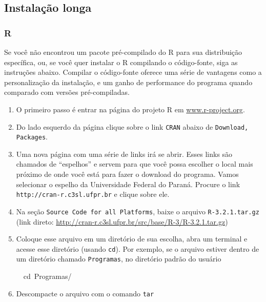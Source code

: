 \documentclass[a4paper,12pt]{article}\usepackage[]{graphicx}\usepackage[]{color}
\makeatletter
\newcommand{\hlopt}[1]{\textcolor[rgb]{0,0,0}{#1}}%
\newcommand{\hlstd}[1]{\textcolor[rgb]{0.345,0.345,0.345}{#1}}%
\newcommand{\hlkwb}[1]{\textcolor[rgb]{0.69,0.353,0.396}{#1}}%
\newenvironment{kframe}{%
 \def\at@end@of@kframe{}%
 \ifinner\ifhmode%
  \def\at@end@of@kframe{\end{minipage}}%
  \begin{minipage}{\columnwidth}%
 \fi\fi%
 \def\FrameCommand##1{\hskip\@totalleftmargin \hskip-\fboxsep
 \colorbox{shadecolor}{##1}\hskip-\fboxsep
     \hskip-\linewidth \hskip-\@totalleftmargin \hskip\columnwidth}%
 \MakeFramed {\advance\hsize-\width
   \@totalleftmargin\z@ \linewidth\hsize
   \@setminipage}}%
 {\par\unskip\endMakeFramed%
 \at@end@of@kframe}
\newenvironment{knitrout}{}{} %
\providecommand{\R}{\textsf{R}\xspace}
\makeatother
\begin{document}
\subsection{Instalação longa}
\label{sec:ill}

\subsubsection{\R}

Se você não encontrou um pacote pré-compilado do \R para sua
distribuição específica, ou, se você quer instalar o \R compilando o
código-fonte, siga as instruções abaixo. Compilar o código-fonte oferece
uma série de vantagens como a personalização da instalação, e um ganho
de performance do programa quando comparado com versões pré-compiladas.

\begin{enumerate}
\item O primeiro passo é entrar na página do projeto \R em
\url{www.r-project.org}.
\item Do lado esquerdo da página clique sobre o link \texttt{CRAN}
  abaixo de \texttt{Download, Packages}.
\item Uma nova página com uma série de links irá se abrir. Esses links
  são chamados de ``espelhos'' e servem para que você possa escolher o
  local mais próximo de onde você está para fazer o download do
  programa. Vamos selecionar o espelho da Universidade Federal do
  Paraná. Procure o link \texttt{http://cran-r.c3sl.ufpr.br} e clique sobre
  ele.
\item Na seção \texttt{Source Code for all Platforms}, baixe o arquivo
  \texttt{R-3.2.1.tar.gz} (link direto:
  \url{http://cran-r.c3sl.ufpr.br/src/base/R-3/R-3.2.1.tar.gz})
\item Coloque esse arquivo em um diretório de sua escolha, abra um
  terminal e acesse esse diretório (usando \texttt{cd}). Por exemplo, se
  o arquivo estiver dentro de um diretório chamado \texttt{Programas},
  no diretório padrão do usuário
\begin{knitrout}\small
{}\color{fgcolor}\begin{kframe}
\noindent
\ttfamily
\hlstd{}\hlstd{\ \ }\hlstd{}\hlkwb{cd\ }\hlstd{Programas}\hlopt{/}\hlstd{}\hspace*{\fill}
\mbox{}
\normalfont
\normalsize
\end{kframe}
\end{knitrout}
\item Descompacte o arquivo com o comando \texttt{tar}

\end{enumerate}
\end{document}
